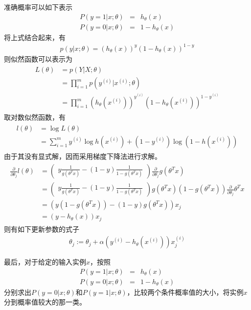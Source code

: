 准确概率可以如下表示
\begin{eqnarray}
P(y=1|x;\theta) &=& h_\theta(x)\\
P(y=0|x;\theta) &=& 1-h_\theta(x)
\end{eqnarray}
将上式结合起来，有
\begin{eqnarray}
p(y|x;\theta)=(h_\theta(x))^y(1-h_\theta(x))^{1-y}
\end{eqnarray}
则似然函数可以表示为
\begin{eqnarray}
\begin{aligned}
L(\theta) &= p(Y|X;\theta)\\
&= \prod_{i=1}^mp(y^{(i)}|x^{(i)};\theta)\\
&= \prod_{i=1}^m(h_\theta(x^{(i)}))^{y^{(i)}}(1-h_\theta(x^{(i)}))^{1-y^{(i)}}
\end{aligned}
\end{eqnarray}
取对数似然函数，有
\begin{eqnarray}
\begin{aligned}
l(\theta) &= \log L(\theta)\\
&= \sum_{i=1}^m y^{(i)}\log h(x^{(i)})+(1-y^{(i)})\log (1-h(x^{(i)}))
\end{aligned}
\end{eqnarray}
由于其没有显式解，因而采用梯度下降法进行求解。
\begin{eqnarray}
\begin{aligned}
\frac{\partial}{\partial \theta_j}l(\theta)
&=\left(
	\begin{aligned}
	y\frac{1}{g(\theta^Tx)}-(1-y)\frac{1}{1-g(\theta^Tx)}
	\end{aligned}
	\right)\frac{\partial}{\partial\theta_j}g(\theta^Tx)\\
&=\left(
	\begin{aligned}
	y\frac{1}{g(\theta^Tx)}-(1-y)\frac{1}{1-g(\theta^Tx)}
	\end{aligned}
	\right)g(\theta^Tx)(1-g(\theta^Tx))\frac{\partial}{\partial\theta_j}\theta^Tx\\
&=(y(1-g(\theta^Tx))-(1-y)g(\theta^Tx))x_j\\
&=(y-h_\theta(x))x_j
\end{aligned}
\end{eqnarray}
则有如下更新参数的式子
\begin{eqnarray}
\theta_j:=\theta_j+\alpha(y^{(i)}-h_\theta(x^{(i)}))x_j^{(i)}
\end{eqnarray}

最后，对于给定的输入实例$x$，按照
\begin{eqnarray}
P(y=1|x;\theta)&=&h_\theta(x)\\
P(y=0|x;\theta)&=&1-h_\theta(x)
\end{eqnarray}
分别求出$P(y=0|x;\theta)$和$P(y=1|x;\theta)$，比较两个条件概率值的大小，将实例$x$分到概率值较大的那一类。

